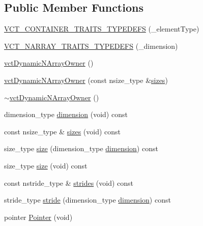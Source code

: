 \subsection*{Public Member Functions}
\begin{DoxyCompactItemize}
\item 
\hyperlink{classvct_dynamic_n_array_owner_af8830d5911394c8a495eb40b5a94d23e}{V\-C\-T\-\_\-\-C\-O\-N\-T\-A\-I\-N\-E\-R\-\_\-\-T\-R\-A\-I\-T\-S\-\_\-\-T\-Y\-P\-E\-D\-E\-F\-S} (\-\_\-element\-Type)
\item 
\hyperlink{classvct_dynamic_n_array_owner_af1c5a0cfd6c57067bd63c10e078c20c8}{V\-C\-T\-\_\-\-N\-A\-R\-R\-A\-Y\-\_\-\-T\-R\-A\-I\-T\-S\-\_\-\-T\-Y\-P\-E\-D\-E\-F\-S} (\-\_\-dimension)
\item 
\hyperlink{classvct_dynamic_n_array_owner_ad2d71d606a6d085370fe1ba2898819ca}{vct\-Dynamic\-N\-Array\-Owner} ()
\item 
\hyperlink{classvct_dynamic_n_array_owner_a7aa030ce966293a84cadb4ba56334858}{vct\-Dynamic\-N\-Array\-Owner} (const nsize\-\_\-type \&\hyperlink{classvct_dynamic_n_array_owner_a014679026d1c8b3c3f07170c58ece520}{sizes})
\item 
\hyperlink{classvct_dynamic_n_array_owner_a37650cc7a003a5fc2398c21885ac76ed}{$\sim$vct\-Dynamic\-N\-Array\-Owner} ()
\item 
dimension\-\_\-type \hyperlink{classvct_dynamic_n_array_owner_ab6cc3614780f6befef472c6bdc790a2a}{dimension} (void) const 
\item 
const nsize\-\_\-type \& \hyperlink{classvct_dynamic_n_array_owner_a014679026d1c8b3c3f07170c58ece520}{sizes} (void) const 
\item 
size\-\_\-type \hyperlink{classvct_dynamic_n_array_owner_a1ef1e879390b1b619c67a521c4337312}{size} (dimension\-\_\-type \hyperlink{classvct_dynamic_n_array_owner_ab6cc3614780f6befef472c6bdc790a2a}{dimension}) const 
\item 
size\-\_\-type \hyperlink{classvct_dynamic_n_array_owner_a713529c4585569ddd8c9f66b61607212}{size} (void) const 
\item 
const nstride\-\_\-type \& \hyperlink{classvct_dynamic_n_array_owner_ac2b1c11c3cbb7ec9351f80177ab9b7b2}{strides} (void) const 
\item 
stride\-\_\-type \hyperlink{classvct_dynamic_n_array_owner_a21c27bbbada4be86f91faa2c3325e81d}{stride} (dimension\-\_\-type \hyperlink{classvct_dynamic_n_array_owner_ab6cc3614780f6befef472c6bdc790a2a}{dimension}) const 
\item 
pointer \hyperlink{classvct_dynamic_n_array_owner_a9ac9adb258e8d104e3ceaf962623b226}{Pointer} (void)

\end{DoxyCompactItemize}
